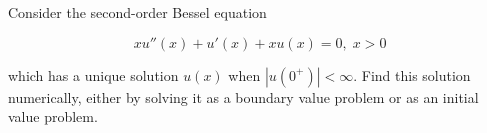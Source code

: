 Consider the second-order Bessel equation

$$
x u''(x) + u'(x) + x u(x) = 0 ,\; x > 0
$$

which has a unique solution $u(x)$ when $|u(0^+)| < \infty$. Find this solution numerically, either by solving it as a
boundary value problem or as an initial value problem.

\begin{solution}\ \\\\
    \ \\
\end{solution}